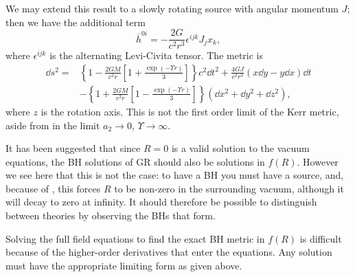 We may extend this result to a slowly rotating source with angular momentum $J$; then we have the additional term\cite{Hobson2006}
\begin{equation}
\overline{h}^{0i} = -\frac{2G}{c^2r^3} \epsilon^{ijk}J_j x_k,
\end{equation}
where $\epsilon^{ijk}$ is the alternating Levi-Civita tensor. The metric is
\begin{align}
\dd s^2 = {} & \left\{1-\frac{2GM}{c^2r}\left[1 + \frac{\exp(- \Upsilon r)}{3}\right]\right\}c^2\dd t^2 + \frac{4GJ}{c^2r^3}\left(x\dd y - y\dd x\right)\dd t \nonumber \\ & - {} \left\{1 +\frac{2GM}{c^2r}\left[1 - \frac{\exp(- \Upsilon r)}{3}\right]\right\}\left(\dd x^2 + \dd y^2 + \dd z^2\right),
\end{align}
where $z$ is the rotation axis. This is not the first order limit of the Kerr metric, aside from in the limit $a_2 \rightarrow 0$, $\Upsilon \rightarrow \infty$.

It has been suggested that since $R = 0$ is a valid solution to the vacuum equations, the BH solutions of GR should also be solutions in $f(R)$\cite{Psaltis2008, Barausse2008}. However we see here that this is not the case: to have a BH you must have a source, and, because of , this forces $R$ to be non-zero in the surrounding vacuum, although it will decay to zero at infinity\cite{Olmo2007c}. It should therefore be possible to distinguish between theories by observing the BHs that form.

Solving the full field equations to find the exact BH metric in $f(R)$ is difficult because of the higher-order derivatives that enter the equations. Any solution must have the appropriate limiting form as given above.

